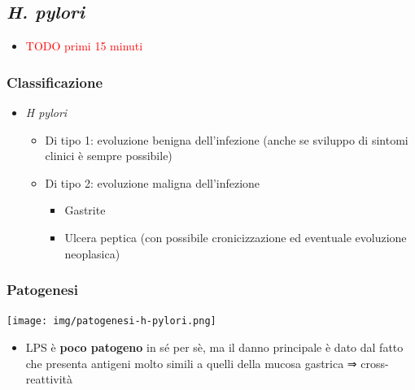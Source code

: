 \documentclass[italian,]{article}
\providecommand{\tightlist}{%
  \setlength{\itemsep}{0pt}\setlength{\parskip}{0pt}}
\newcommand{\TODO}[1]{\textcolor{red}{\textsf{\footnotesize{TODO #1}}}} %
\begin{document}
\hypertarget{h.-pylori}{%
\subsection{\texorpdfstring{\emph{H.
pylori}}{H. pylori}}\label{h.-pylori}}

\begin{itemize}
\item
  \TODO{primi 15 minuti}
\end{itemize}

\hypertarget{classificazione-1}{%
\subsubsection{Classificazione}\label{classificazione-1}}

\begin{itemize}
\tightlist
\item
  \emph{H pylori}

  \begin{itemize}
  \tightlist
  \item
    Di tipo 1: evoluzione benigna dell'infezione (anche se sviluppo di
    sintomi clinici è sempre possibile)
  \item
    Di tipo 2: evoluzione maligna dell'infezione

    \begin{itemize}
    \tightlist
    \item
      Gastrite
    \item
      Ulcera peptica (con possibile cronicizzazione ed eventuale
      evoluzione neoplasica)
    \end{itemize}
  \end{itemize}
\end{itemize}

\hypertarget{patogenesi-1}{%
\subsubsection{Patogenesi}\label{patogenesi-1}}

\texttt{[image: img/patogenesi-h-pylori.png]}~

\begin{itemize}
\tightlist
\item
  LPS è \textbf{poco patogeno} in sé per sè, ma il danno principale è
  dato dal fatto che presenta antigeni molto simili a quelli della
  mucosa gastrica ⇒ cross-reattività
\end{itemize}
\end{document}
